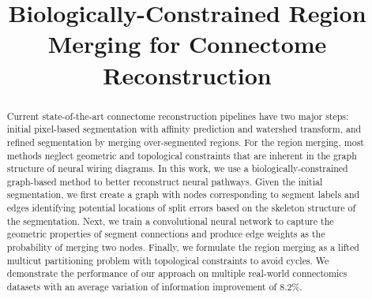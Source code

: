 \documentclass[10pt,twocolumn,letterpaper]{article}
\begin{document}
	
	\title{Biologically-Constrained Region Merging for Connectome Reconstruction}

	
	\maketitle
	
	\begin{abstract}
	Current state-of-the-art connectome reconstruction pipelines have two major steps: initial pixel-based segmentation with affinity prediction and watershed transform, and refined segmentation by merging over-segmented regions.
	For the region merging, most methods neglect geometric and topological constraints that are inherent in the graph structure of neural wiring diagrams.
	In this work, we use a biologically-constrained graph-based method to better reconstruct neural pathways.
	Given the initial segmentation, we first create a graph with nodes corresponding to segment labels and edges identifying potential locations of split errors based on the skeleton structure of the segmentation.
	Next, we train a convolutional neural network to capture the geometric properties of segment connections and produce edge weights as the probability of merging two nodes.
	Finally, we formulate the region merging as a lifted multicut partitioning problem with topological constraints to avoid cycles.
	We demonstrate the performance of our approach on multiple real-world connectomics datasets with an average variation of information improvement of 8.2\%.
	\end{abstract}
	
	
	
	
	
	
	
	
	
	
	
	
	
	
	{\small
		
		}
	
\end{document}

